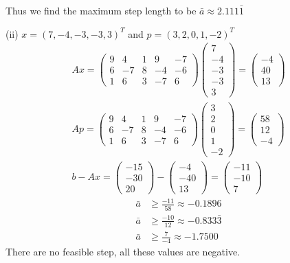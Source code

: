 \documentclass{article}
\begin{document}
Thus we find the maximum step length to be $\bar{a} \approx 2.111\bar{1}$

\setcounter{equation}{0}

\noindent(ii) $x = (7,-4,-3,-3,3)^T$ and $p = (3,2,0,1,-2)^T$
\begin{align*}
    Ax = \begin{pmatrix}
        9 & 4 & 1 & 9 & -7 \\
        6 & -7 & 8 & -4 & -6 \\ 
        1 & 6 & 3 & -7 & 6
    \end{pmatrix}
    \begin{pmatrix}
        7 \\ -4 \\ -3 \\ -3 \\ 3
    \end{pmatrix} = \begin{pmatrix}
        -4 \\ 40 \\ 13
    \end{pmatrix} \\
    Ap = \begin{pmatrix}
        9 & 4 & 1 & 9 & -7 \\
        6 & -7 & 8 & -4 & -6 \\ 
        1 & 6 & 3 & -7 & 6
    \end{pmatrix}
    \begin{pmatrix}
        3 \\ 2 \\ 0 \\ 1 \\ -2
    \end{pmatrix} = \begin{pmatrix}
        58 \\ 12 \\ -4
    \end{pmatrix} \\
    b - Ax = \begin{pmatrix}
        -15 \\ -30 \\ 20  
    \end{pmatrix} -
    \begin{pmatrix}
        -4 \\ -40 \\ 13
    \end{pmatrix} =
    \begin{pmatrix}
        -11 \\ -10 \\ 7
    \end{pmatrix} 
\end{align*}
\begin{align}
    \bar{a} &\geq \frac{-11}{58} \approx -0.1896 \\
    \bar{a} & \geq \frac{-10}{12} \approx -0.833\bar{3} \\
    \bar{a} & \geq \frac{7}{-4} \approx -1.7500
\end{align}
There are no feasible step, all these values are negative.
\end{document}
